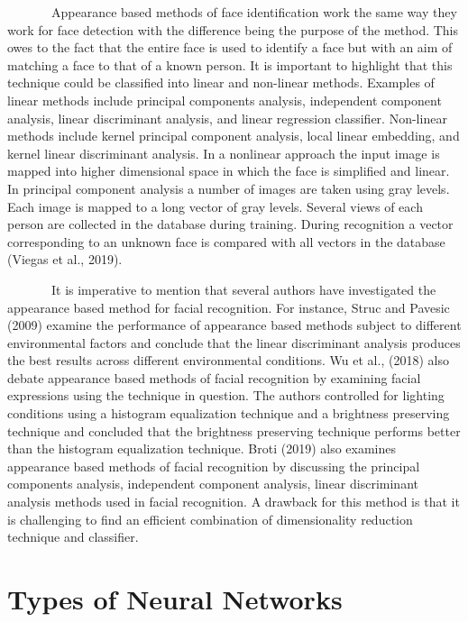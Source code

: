 \documentclass[
  12pt,
]{report}
\begin{document}
~~~~~~~Appearance based methods of face identification work the same way
they work for face detection with the difference being the purpose of
the method. This owes to the fact that the entire face is used to
identify a face but with an aim of matching a face to that of a known
person. It is important to highlight that this technique could be
classified into linear and non-linear methods. Examples of linear
methods include principal components analysis, independent component
analysis, linear discriminant analysis, and linear regression
classifier. Non-linear methods include kernel principal component
analysis, local linear embedding, and kernel linear discriminant
analysis. In a nonlinear approach the input image is mapped into higher
dimensional space in which the face is simplified and linear. In
principal component analysis a number of images are taken using gray
levels. Each image is mapped to a long vector of gray levels. Several
views of each person are collected in the database during training.
During recognition a vector corresponding to an unknown face is compared
with all vectors in the database (Viegas et al., 2019).

~~~~~~~It is imperative to mention that several authors have
investigated the appearance based method for facial recognition. For
instance, Struc and Pavesic (2009) examine the performance of appearance
based methods subject to different environmental factors and conclude
that the linear discriminant analysis produces the best results across
different environmental conditions. Wu et al., (2018) also debate
appearance based methods of facial recognition by examining facial
expressions using the technique in question. The authors controlled for
lighting conditions using a histogram equalization technique and a
brightness preserving technique and concluded that the brightness
preserving technique performs better than the histogram equalization
technique. Broti (2019) also examines appearance based methods of facial
recognition by discussing the principal components analysis, independent
component analysis, linear discriminant analysis methods used in facial
recognition. A drawback for this method is that it is challenging to
find an efficient combination of dimensionality reduction technique and
classifier.

\section{Types of Neural Networks}\label{types-of-neural-networks}
\end{document}
